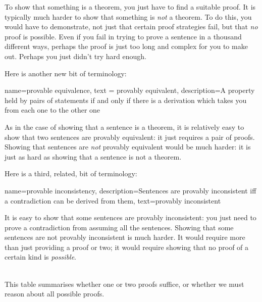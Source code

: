 To show that something is a theorem, you just have to find a suitable proof. It is typically much harder to show that something is \emph{not} a theorem. To do this, you would have to demonstrate, not just that certain proof strategies fail, but that \emph{no} proof is possible. Even if you fail in trying to prove a sentence in a thousand different ways, perhaps the proof is just too long and complex for you to make out. Perhaps you just didn't try hard enough.

Here is another new bit of terminology:
        
{
  name=provable equivalence,
  text = provably equivalent,
description={A property held by pairs of statements if and only if there is a derivation which takes you from each one to the other one}
}


As in the case of showing that a sentence is a theorem, it is relatively easy to show that two sentences are provably equivalent: it just requires a pair of proofs. Showing that sentences are \emph{not} provably equivalent would be much harder: it is just as hard as showing that a sentence is not a theorem. 

Here is a third, related, bit of terminology:
        
{    name={provable inconsistency}, 
  description={Sentences are provably inconsistent iff a contradiction can be derived from them},
    text={provably inconsistent}
}

It is easy to show that some sentences are provably inconsistent: you just need to prove a contradiction from assuming all the sentences. Showing that some sentences are not provably inconsistent is much harder. It would require more than just providing a proof or two; it would require showing that no proof of a certain kind is \emph{possible}.

\
\\
This table summarises whether one or two proofs suffice, or whether we must reason about all possible proofs.

